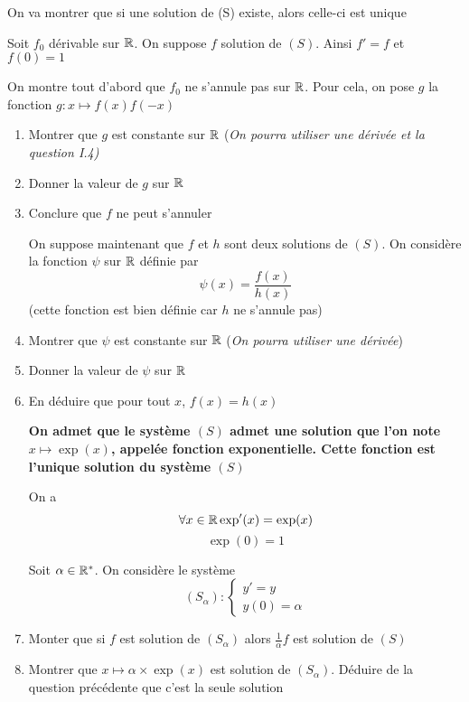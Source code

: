 On va montrer que si une solution de (S) existe, alors celle-ci est unique\newline

Soit $f_0$ dérivable sur $\mathbb{R}$. On suppose $f$ solution de $(S)$. Ainsi $f' = f$ et $f(0) = 1$\newline

On montre tout d'abord que $f_0$ ne s'annule pas sur $\mathbb{R}$. Pour cela, on pose $g$ la fonction $g : x\mapsto f(x)f(-x)$
\begin{enumerate}
\item Montrer que $g$ est constante sur $\mathbb{R}$ (\emph{On pourra utiliser une dérivée et la question I.4)}
\item Donner la valeur de $g$ sur $\mathbb{R}$
\item Conclure que $f$ ne peut s'annuler\newline

On suppose maintenant que $f$ et $h$ sont deux solutions de $(S)$. On considère la fonction $\psi$ sur $\mathbb{R}$ définie par $$\psi(x) = \frac{f(x)}{h(x)}$$
(cette fonction est bien définie car $h$ ne s'annule pas)
\item Montrer que $\psi$ est constante sur $\mathbb{R}$ (\emph{On pourra utiliser une dérivée})
\item Donner la valeur de $\psi$ sur $\mathbb{R}$
\item En déduire que pour tout $x$, $f(x) = h(x)$\newline

\textbf{On admet que le système $(S)$ admet une solution que l'on note $x\mapsto \exp(x)$, appelée fonction exponentielle. Cette fonction est l'unique solution du système $(S)$}\newline


On a $$\forall x \in \mathbb{R} \exp'(x) = \exp(x)$$
$$\exp(0) =1$$

Soit $\alpha \in \mathbb{R}^*$. On considère le système
$$(S_\alpha) : \left\{ \begin{array}{l}y'=y \\ y(0)=\alpha \end{array}\right.$$
\item Monter que si $f$ est solution de $(S_\alpha)$ alors $\frac{1}{\alpha}f$ est solution de $(S)$
\item Montrer que $x\mapsto \alpha\times \exp(x)$ est solution de $(S_\alpha)$. Déduire de la question précédente que c'est la seule solution
\end{enumerate}
